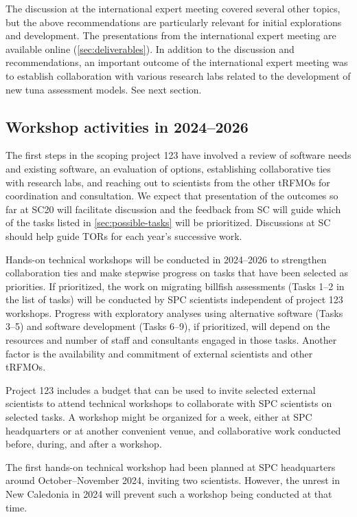 \documentclass{SCreport}
\begin{document}
The discussion at the international expert meeting covered several other topics,
but the above recommendations are particularly relevant for initial explorations
and development. The presentations from the international expert meeting are
available online (\autoref{sec:deliverables}). In addition to the discussion and
recommendations, an important outcome of the international expert meeting was to
establish collaboration with various research labs related to the development of
new tuna assessment models. See next section.

\subsection{Workshop activities in 2024--2026}

The first steps in the scoping project 123 have involved a review of software
needs and existing software, an evaluation of options, establishing
collaborative ties with research labs, and reaching out to scientists from the
other tRFMOs for coordination and consultation. We expect that presentation of
the outcomes so far at SC20 will facilitate discussion and the feedback from SC
will guide which of the tasks listed in \autoref{sec:possible-tasks} will be
prioritized. Discussions at SC should help guide TORs for each year's successive
work.

Hands-on technical workshops will be conducted in 2024--2026 to strengthen
collaboration ties and make stepwise progress on tasks that have been selected
as priorities. If prioritized, the work on migrating billfish assessments (Tasks
1--2 in the list of tasks) will be conducted by SPC scientists independent of
project 123 workshops. Progress with exploratory analyses using alternative
software (Tasks 3--5) and software development (Tasks 6--9), if prioritized,
will depend on the resources and number of staff and consultants engaged in
those tasks. Another factor is the availability and commitment of external
scientists and other tRFMOs.

Project 123 includes a budget that can be used to invite selected external
scientists to attend technical workshops to collaborate with SPC scientists on
selected tasks. A workshop might be organized for a week, either at SPC
headquarters or at another convenient venue, and collaborative work conducted
before, during, and after a workshop.

The first hands-on technical workshop had been planned at SPC headquarters
around October--November 2024, inviting two scientists. However, the unrest in
New Caledonia in 2024 will prevent such a workshop being conducted at that time.
\end{document}
